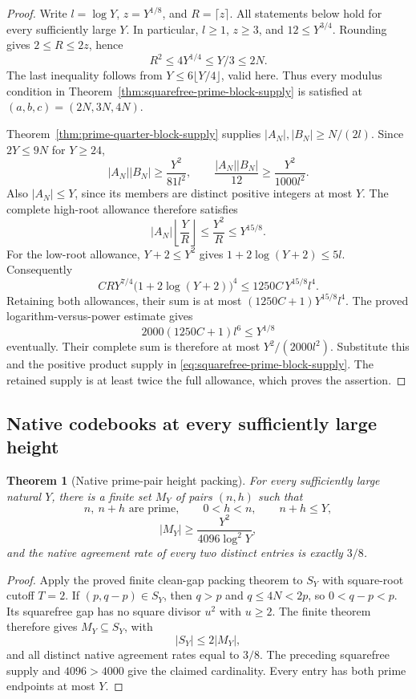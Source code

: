\documentclass[11pt]{article}
\newtheorem{theorem}{Theorem}[section]
\begin{document}
\begin{proof}
Write \(l=\log Y\), \(z=Y^{1/8}\), and \(R=\lceil z\rceil\).
All statements below hold for every sufficiently large \(Y\).
In particular, \(l\ge1\), \(z\ge3\), and \(12\le Y^{3/4}\).
Rounding gives \(2\le R\le2z\), hence
\[
 R^2\le4Y^{1/4}\le Y/3\le2N.
\]
The last inequality follows from \(Y\le6\lfloor Y/4\rfloor\),
valid here. Thus every modulus condition in
Theorem~\ref{thm:squarefree-prime-block-supply} is satisfied at
\((a,b,c)=(2N,3N,4N)\).

Theorem~\ref{thm:prime-quarter-block-supply} supplies
\(|A_N|,|B_N|\ge N/(2l)\). Since \(2Y\le9N\) for \(Y\ge24\),
\[
 |A_N||B_N|\ge\frac{Y^2}{81l^2},\qquad
 \frac{|A_N||B_N|}{12}\ge\frac{Y^2}{1000l^2}.
\]
Also \(|A_N|\le Y\), since its members are distinct positive integers
at most \(Y\). The complete high-root allowance therefore satisfies
\[
 |A_N|\left\lfloor\frac YR\right\rfloor
       \le\frac{Y^2}{R}\le Y^{15/8}.
\]
For the low-root allowance, \(Y+2\le Y^2\) gives
\(1+2\log(Y+2)\le5l\). Consequently
\[
 CRY^{7/4}\bigl(1+2\log(Y+2)\bigr)^4
       \le1250C\,Y^{15/8}l^4.
\]
Retaining both allowances, their sum is at most
\((1250C+1)Y^{15/8}l^4\). The proved logarithm-versus-power estimate
gives
\[
 2000(1250C+1)l^6\le Y^{1/8}
\]
eventually. Their complete sum is therefore at most
\(Y^2/(2000l^2)\). Substitute this and the positive product supply
in \eqref{eq:squarefree-prime-block-supply}. The retained supply is
at least twice the full allowance, which proves the assertion.
\end{proof}

\subsection{Native codebooks at every sufficiently large height}

\begin{theorem}[Native prime-pair height packing]
\label{thm:asymptotic-native-height-packing}
For every sufficiently large natural \(Y\), there is a finite
set \(M_Y\) of pairs \((n,h)\) such that
\[
 n,\ n+h\text{ are prime},\qquad 0<h<n,\qquad n+h\le Y,
\]
\[
                         |M_Y|\ge\frac{Y^2}{4096\log^2Y},
\]
and the native agreement rate of every two distinct entries is
exactly \(3/8\).
\end{theorem}

\begin{proof}
Apply the proved finite clean-gap packing theorem to \(S_Y\) with
square-root cutoff \(T=2\). If \((p,q-p)\in S_Y\), then
\(q>p\) and \(q\le4N<2p\), so \(0<q-p<p\).
Its squarefree gap has no square divisor \(u^2\) with \(u\ge2\).
The finite theorem therefore gives \(M_Y\subseteq S_Y\), with
\[
 |S_Y|\le2|M_Y|,
\]
and all distinct native agreement rates equal to \(3/8\).
The preceding squarefree supply and \(4096>4000\) give the claimed
cardinality. Every entry has both prime endpoints at most \(Y\).
\end{proof}
\end{document}
